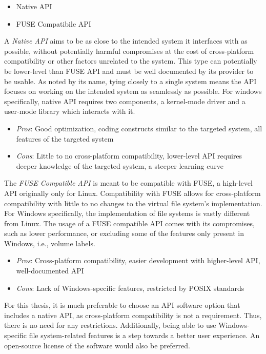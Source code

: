 \begin{itemize}
    \item Native API
    \item FUSE Compatibile API
\end{itemize}

A \textit{Native API} aims to be as close to the intended system it interfaces with as possible, without potentially harmful compromises at the cost of cross-platform compatibility or other factors unrelated to the system. This type can potentially be lower-level than FUSE API and must be well documented by its provider to be usable. As noted by its name, tying closely to a single system means the API focuses on working on the intended system as seamlessly as possible. For windows specifically, native API requires two components, a kernel-mode driver and a user-mode library which interacts with it.

\begin{itemize}
    \item \textit{Pros}: Good optimization, coding constructs similar to the targeted system, all features of the targeted system
    \item \textit{Cons}: Little to no cross-platform compatibility, lower-level API requires deeper knowledge of the targeted system, a steeper learning curve
\end{itemize}

The \textit{FUSE Compatible API} is meant to be compatible with FUSE, a high-level API originally only for Linux. Compatibility with FUSE allows for cross-platform compatibility with little to no changes to the virtual file system's implementation. For Windows specifically, the implementation of file systems is vastly different from Linux. The usage of a FUSE compatible API comes with its compromises, such as lower performance, or excluding some of the features only present in Windows, i.e., volume labels.\cite{WinFspVSFUSE}\cite{FUSE}

\begin{itemize}
    \item \textit{Pros}: Cross-platform compatibility, easier development with higher-level API, well-documented API
    \item \textit{Cons}: Lack of Windows-specific features, restricted by POSIX standards
\end{itemize}

For this thesis, it is much preferable to choose an API software option that includes a native API, as cross-platform compatibility is not a requirement. Thus, there is no need for any restrictions. Additionally, being able to use Windows-specific file system-related features is a step towards a better user experience. An open-source license of the software would also be preferred.

